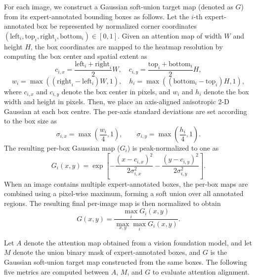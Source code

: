 \documentclass[lineno,pdflatex,sn-mathphys-num]{sn-jnl}%
\theoremstyle{thmstyleone}%
\theoremstyle{thmstyletwo}%
\theoremstyle{thmstylethree}%
\begin{document}
For each image, we construct a Gaussian soft-union target map (denoted as $G$) from its expert-annotated bounding boxes as follows. Let the $i$-th expert-annotated box be represented by normalized corner coordinates $(\mathrm{left}_i, \mathrm{top}_i, \mathrm{right}_i, \mathrm{bottom}_i) \in [0, 1]$. Given an attention map of width $W$ and height $H$, the box coordinates are mapped to the heatmap resolution by computing the box center and spatial extent as
\begin{equation}
c_{i,x} = \frac{\mathrm{left}_i + \mathrm{right}_i}{2}W,
\quad
c_{i,y} = \frac{\mathrm{top}_i + \mathrm{bottom}_i}{2}H,
\end{equation}
\begin{equation}
w_i = \max\left(\left(\mathrm{right}_i - \mathrm{left}_i\right)W, 1\right),
\quad
h_i = \max\left(\left(\mathrm{bottom}_i - \mathrm{top}_i\right)H, 1\right),
\end{equation}
where $c_{i,x}$ and $c_{i,y}$ denote the box center in pixels, and $w_i$ and $h_i$ denote the box width and height in pixels. Then, we place an axis-aligned anisotropic 2-D Gaussian at each
box centre. The per-axis standard deviations are set according to the box size as
\begin{equation}
\sigma_{i,x} = \max\left(\frac{w_i}{4}, 1\right),
\qquad
\sigma_{i,y} = \max\left(\frac{h_i}{4}, 1\right).
\end{equation}
The resulting per-box Gaussian map ($G_i$) is peak-normalized to one as
\begin{equation}
G_i(x, y) = \exp\left[-\frac{(x - c_{i,x})^{2}}{2\sigma_{i,x}^{2}}-\frac{(y - c_{i,y})^{2}}{2\sigma_{i,y}^{2}}\right].
\end{equation}
When an image contains multiple expert-annotated boxes, the per-box maps are combined using a pixel-wise maximum, forming a soft union over all annotated regions. The resulting final per-image map is then normalized to obtain
\begin{equation}
G(x, y) = \frac{\max_{i} G_i(x, y)}{\max_{x, y} \max_{i} G_i(x, y)}.
\end{equation}


Let $A$ denote the attention map obtained from a vision foundation model, and let $M$ denote the union binary mask of expert-annotated boxes, and $G$ is the Gaussian soft-union target map constructed from the same boxes. The following five metrics are computed between $A$, $M$, and $G$ to evaluate attention alignment.
\end{document}
